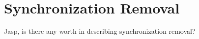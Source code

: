 \section{Synchronization Removal}
\label{sec:synchremoval}

Jasp, is there any worth in describing synchronization removal? 
